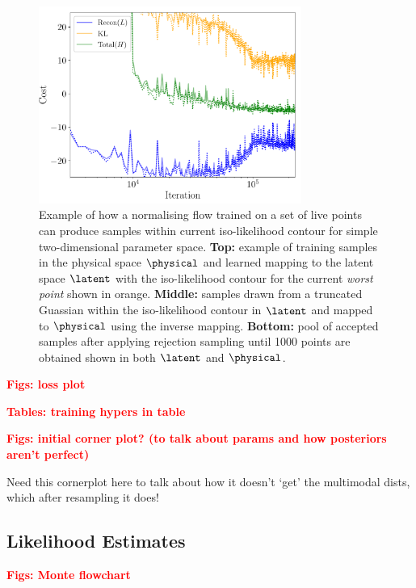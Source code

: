 \documentclass[aps,superscriptaddress,twocolumn,nopreprintnumbers,floatfix,groupedaddress]{revtex4-1}
\newcommand{\figwidth}{8.6cm}
\begin{document}
\begin{figure}
	\centering
	\includegraphics[width=\figwidth]{figs/cost.pdf}
	\caption{Example of how a normalising flow trained on a set of live points can produce samples within current iso-likelihood contour for simple two-dimensional parameter space. \textbf{Top:} example of training samples in the physical space $\physical$ and learned mapping to the latent space $\latent$ with the iso-likelihood contour for the current \textit{worst point} shown in orange. \textbf{Middle:} samples drawn from a truncated Guassian within the iso-likelihood contour in $\latent$ and mapped to $\physical$ using the inverse mapping. \textbf{Bottom:} pool of accepted samples after applying rejection sampling until 1000 points are obtained shown in both $\latent$ and $\physical$.}
	\label{fig:learning_contours}
\end{figure}

\textbf{\textcolor{red}{Figs: loss plot}}

\textbf{\textcolor{red}{Tables: training hypers in table}}

\textbf{\textcolor{red}{Figs: initial corner plot? (to talk about params and how posteriors aren't perfect)}}

Need this cornerplot here to talk about how it doesn't `get' the multimodal dists, which after resampling it does!

\subsection{Likelihood Estimates}

\textbf{\textcolor{red}{Figs: Monte flowchart}}
\end{document}

